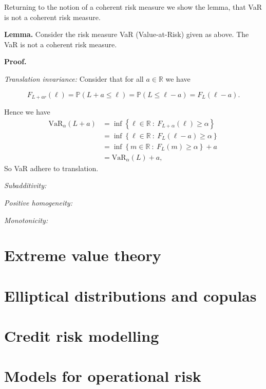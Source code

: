 \documentclass[a4paper,12pt,openany]{book}
\begin{document}
Returning to the notion of a coherent risk measure we show the lemma, that VaR is not a coherent risk measure.

\textbf{Lemma.} Consider the risk measure VaR (Value-at-Risk) given as above. The VaR is not a coherent risk measure.

\textbf{Proof.}

\emph{Translation invariance:} Consider that for all \(a\in\mathbb R\) we have

\[
F_{L+ar}(\ell)=\mathbb P(L+a\le \ell)=\mathbb P(L\le\ell - a)=F_L(\ell-a).
\]

Hence we have
\begin{align*}
\text{VaR}_\alpha(L+a)&=\inf\left\{ \ell\in\mathbb{R}\ :\ F_{L+\alpha}(\ell)\ge \alpha \right\}\\
&=\inf\left\{ \ell\in\mathbb{R}\ :\ F_{L}(\ell-a)\ge \alpha \right\}\\
&=\inf\left\{ m\in\mathbb{R}\ :\ F_{L}(m)\ge \alpha \right\}+a\\
&=\text{VaR}_\alpha(L)+a,
\end{align*}
So VaR adhere to translation.

\emph{Subadditivity:}

\emph{Positive homogeneity:}

\emph{Monotonicity:}

\hypertarget{extreme-value-theory}{%
\section{Extreme value theory}\label{extreme-value-theory}}

\hypertarget{elliptical-distributions-and-copulas}{%
\section{Elliptical distributions and copulas}\label{elliptical-distributions-and-copulas}}

\hypertarget{credit-risk-modelling}{%
\section{Credit risk modelling}\label{credit-risk-modelling}}

\hypertarget{models-for-operational-risk}{%
\section{Models for operational risk}\label{models-for-operational-risk}}
\end{document}
